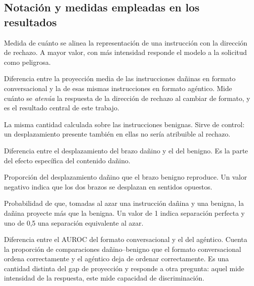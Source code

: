 \documentclass[12pt,a4paper]{article}
\begin{document}
\subsection*{Notación y medidas empleadas en los resultados}

\begin{description}[leftmargin=0pt, style=nextline, itemsep=0.45em]

  \item[Proyección ($p$)] Medida de cuánto se alinea la representación de una instrucción con la dirección de rechazo. A mayor valor, con más intensidad responde el modelo a la solicitud como peligrosa.

  \item[Gap de proyección ($\Delta p_{h}$)] Diferencia entre la proyección media de las instrucciones dañinas en formato conversacional y la de esas mismas instrucciones en formato agéntico. Mide cuánto se \emph{atenúa} la respuesta de la dirección de rechazo al cambiar de formato, y es el resultado central de este trabajo.

  \item[Desplazamiento del brazo benigno ($\Delta p_{b}$)] La misma cantidad calculada sobre las instrucciones benignas. Sirve de control: un desplazamiento presente también en ellas no sería atribuible al rechazo.

  \item[Interacción o diferencia en diferencias ($\Delta^{2} p$)] Diferencia entre el desplazamiento del brazo dañino y el del benigno. Es la parte del efecto específica del contenido dañino.

  \item[Fracción común ($\varphi$)] Proporción del desplazamiento dañino que el brazo benigno reproduce. Un valor negativo indica que los dos brazos se desplazan en sentidos opuestos.

  \item[AUROC] Probabilidad de que, tomadas al azar una instrucción dañina y una benigna, la dañina proyecte más que la benigna. Un valor de 1 indica separación perfecta y uno de 0{,}5 una separación equivalente al azar.

  \item[Gap de detección ($\Delta$AUROC)] Diferencia entre el AUROC del formato conversacional y el del agéntico. Cuenta la proporción de comparaciones dañino--benigno que el formato conversacional ordena correctamente y el agéntico deja de ordenar correctamente. Es una cantidad distinta del gap de proyección y responde a otra pregunta: aquel mide intensidad de la respuesta, este mide capacidad de discriminación.


\end{description}
\end{document}
